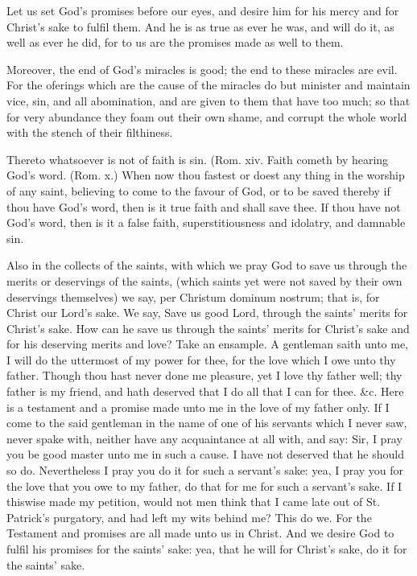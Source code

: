 Let us set God's promises before our eyes, and desire 
him for his mercy and for Christ's sake to fulfil them. 
And he is as true as ever he was, and will do it, as well 
as ever he did, for to us are the promises made as well 
to them. 

Moreover, the end of God's miracles is good; the end to 
these miracles are evil. For the oferings which are the 
cause of the miracles do but minister and maintain vice, 
sin, and all abomination, and are given to them that have 
too much; so that for very abundance they foam out their 
own shame, and corrupt the whole world with the stench 
of their filthiness. 

Thereto whatsoever is not of faith is sin. (Rom. xiv. 
Faith cometh by hearing God's word. (Rom. x.) When 
now thou fastest or doest any thing in the worship of any
saint, believing to come to the favour of God, or to be saved 
thereby if thou have God's word, then is it true faith and 
shall save thee. If thou have not God's word, then is it a
false faith, superstitiousness and idolatry, and damnable 
sin. 

Also in the collects of the saints, with which we pray
God to save us through the merits or deservings of the 
saints, (which saints yet were not saved by their own deservings
themselves) we say, per Christum dominum nostrum;
that is, for Christ our Lord's sake. We say, Save us 
good Lord, through the saints' merits for Christ's sake.
How can he save us through the saints' merits for Christ's 
sake and for his deserving merits and love? Take an ensample.
A gentleman saith unto me, I will do the uttermost
of my power for thee, for the love which I owe unto 
thy father. Though thou hast never done me pleasure, 
yet I love thy father well; thy father is my friend, and hath 
deserved that I do all that I can for thee. \&c. Here is a 
testament and a promise made unto me in the love of my 
father only. If I come to the said gentleman in the name 
of one of his servants which I never saw, never spake with, 
neither have any acquaintance at all with, and say: Sir, 
I pray you be good master unto me in such a cause. I
have not deserved that he should so do. Nevertheless I
pray you do it for such a servant's sake: yea, I pray you
for the love that you owe to my father, do that for me for
such a servant's sake. If I thiswise made my petition,
would not men think that I came late out of St. Patrick's
purgatory, and had left my wits behind me? This do we.
For the Testament and promises are all made unto us in
Christ. And we desire God to fulfil his promises for
the saints' sake: yea, that he will for Christ's sake, do it
for the saints' sake.


